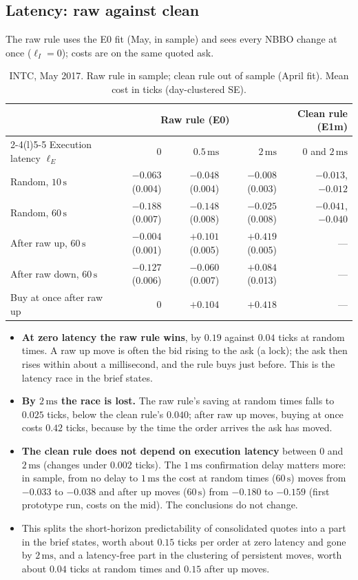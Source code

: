 \documentclass[11pt]{article}
\theoremstyle{definition}
\theoremstyle{remark}
\newcommand{\Eo}{\textsf{E0}}
\newcommand{\Em}{\textsf{E1m}}
\newcommand{\ms}{\,\text{ms}}
\newcommand{\sx}{\,\text{s}}
\begin{document}
\subsection{Latency: raw against clean}
\label{sec:res-raw}

The raw rule uses the \Eo{} fit (May, in sample) and sees every NBBO change at once ($\ell_I = 0$); costs are on the same quoted ask.

\begin{table}[ht]
\centering
\small
\begin{tabular}{@{}lrrrr@{}}
\toprule
& \multicolumn{3}{c}{Raw rule (\Eo)} & Clean rule (\Em) \\
\cmidrule(lr){2-4}\cmidrule(l){5-5}
Execution latency $\ell_E$ & $0$ & $0.5\ms$ & $2\ms$ & $0$ and $2\ms$ \\
\midrule
Random, $10\sx$ & $-0.063$ (0.004) & $-0.048$ (0.004) & $-0.008$ (0.003) & $-0.013$, $-0.012$ \\
Random, $60\sx$ & $-0.188$ (0.007) & $-0.148$ (0.008) & $-0.025$ (0.008) & $-0.041$, $-0.040$ \\
After raw up, $60\sx$ & $-0.004$ (0.001) & $+0.101$ (0.005) & $+0.419$ (0.005) & --- \\
After raw down, $60\sx$ & $-0.127$ (0.006) & $-0.060$ (0.007) & $+0.084$ (0.013) & --- \\
Buy at once after raw up & $0$ & $+0.104$ & $+0.418$ & --- \\
\bottomrule
\end{tabular}
\caption{INTC, May 2017. Raw rule in sample; clean rule out of sample (April fit). Mean cost in ticks (day-clustered SE).}
\label{tab:latency}
\end{table}

\begin{itemize}
\item \textbf{At zero latency the raw rule wins}, by $0.19$ against $0.04$ ticks at random times. A raw up move is often the bid rising to the ask (a lock); the ask then rises within about a millisecond, and the rule buys just before. This is the latency race in the brief states.
\item \textbf{By $2\ms$ the race is lost.} The raw rule's saving at random times falls to $0.025$ ticks, below the clean rule's $0.040$; after raw up moves, buying at once costs $0.42$ ticks, because by the time the order arrives the ask has moved.
\item \textbf{The clean rule does not depend on execution latency} between $0$ and $2\ms$ (changes under $0.002$ ticks). The $1\ms$ confirmation delay matters more: in sample, from no delay to $1\ms$ the cost at random times ($60\sx$) moves from $-0.033$ to $-0.038$ and after up moves ($60\sx$) from $-0.180$ to $-0.159$ (first prototype run, costs on the mid). The conclusions do not change.
\item This splits the short-horizon predictability of consolidated quotes into a part in the brief states, worth about $0.15$ ticks per order at zero latency and gone by $2\ms$, and a latency-free part in the clustering of persistent moves, worth about $0.04$ ticks at random times and $0.15$ after up moves.
\end{itemize}
\end{document}
